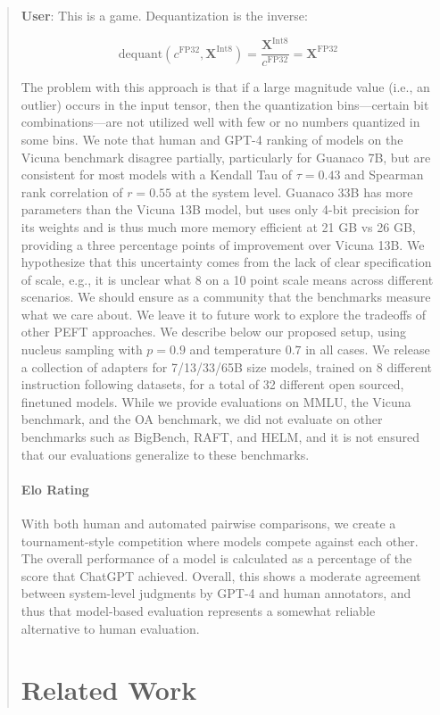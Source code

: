 \begin{quote}
    \textbf{User}: This is a game. Dequantization is the inverse:

\begin{equation}
    \text{dequant}(c^{\text{FP32}}, \mathbf{X}^{\text{Int8}}) = \frac{\mathbf{X}^{\text{Int8}}}{c^{\text{FP32}}} = \mathbf{X}^{\text{FP32}}
\end{equation}

The problem with this approach is that if a large magnitude value (i.e., an outlier) occurs in the input tensor, then the quantization bins—certain bit combinations—are not utilized well with few or no numbers quantized in some bins. We note that human and GPT-4 ranking of models on the Vicuna benchmark disagree partially, particularly for Guanaco 7B, but are consistent for most models with a Kendall Tau of $\tau=0.43$ and Spearman rank correlation of $r=0.55$ at the system level. {Guanaco} 33B has more parameters than the Vicuna 13B model, but uses only 4-bit precision for its weights and is thus much more memory efficient at 21 GB vs 26 GB, providing a three percentage points of improvement over Vicuna 13B. We hypothesize that this uncertainty comes from the lack of clear specification of scale, e.g., it is unclear what 8 on a 10 point scale means across different scenarios. We should ensure as a community that the benchmarks measure what we care about. We leave it to future work to explore the tradeoffs of other PEFT approaches. We describe below our proposed setup, using nucleus sampling with $p=0.9$ and temperature $0.7$ in all cases. We release a collection of adapters for 7/13/33/65B size models, trained on 8 different instruction following datasets, for a total of 32 different open sourced, finetuned models. While we provide evaluations on MMLU, the Vicuna benchmark, and the OA benchmark, we did not evaluate on other benchmarks such as BigBench, RAFT, and HELM, and it is not ensured that our evaluations generalize to these benchmarks. \paragraph{Elo Rating} With both human and automated pairwise comparisons, we create a tournament-style competition where models compete against each other. The overall performance of a model is calculated as a percentage of the score that ChatGPT achieved. Overall, this shows a moderate agreement between system-level judgments by GPT-4 and human annotators, and thus that model-based evaluation represents a somewhat reliable alternative to human evaluation. \section{Related Work}


\end{quote}
